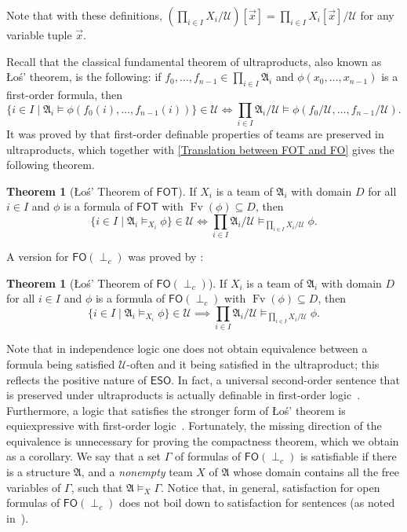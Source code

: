 \documentclass[a4paper]{amsart}
\theoremstyle{definition}
\newtheorem{theorem}[definition]{Theorem}
\theoremstyle{remark}
\newcommand{\A}{\mathcal{A}}
\newcommand{\U}{\mathcal{U}}
\newcommand{\vx}{\vec{x}}
\DeclareMathOperator{\Fv}{Fv}
\newcommand\fot{\mathsf{FOT}}
\newcommand\eso{\mathsf{ESO}}
\newcommand\foil{\mathsf{FO}(\perp_c)}
\theoremstyle{definition}
\renewcommand{\A}{\mathfrak{A}}
\begin{document}
Note that with these definitions, $\left(\prod_{i\in I}X_i/\U\right)[\vx] = \prod_{i\in I}X_i[\vx]/\U$ for any variable tuple $\vx$.

Recall that the classical fundamental theorem of ultraproducts, also known as Łoś' theorem, is the following: if $f_0,\dots,f_{n-1}\in\prod_{i\in I}\A_i$ and $\phi(x_0,\dots,x_{n-1})$ is a first-order formula, then
\[
    \{i\in I \mid \A_i\models\phi(f_0(i),\dots,f_{n-1}(i)) \}\in\U \iff \prod_{i\in I}\A_i/\U \models\phi(f_0/\U,\dots,f_{n-1}/\U).
\]
It was proved by \textcite{luck2020team} that first-order definable properties of teams are preserved in ultraproducts, which together with \cref{Translation between FOT and FO} gives the following theorem. 

\begin{theorem}[Łoś' Theorem of $\fot$]\label{Los theorem of FOT}
    If $X_i$ is a team of $\A_i$ with domain $D$ for all $i\in I$ and $\phi$ is a formula of $\fot$ with $\Fv(\phi)\subseteq D$, then
    \[
        \{ i\in I \mid \A_i\models_{X_i}\phi \}\in\U \iff \prod_{i\in I}\A_i/\U\models_{\prod_{i\in I}X_i/\U}\phi.
    \]
\end{theorem}

\noindent A version for $\foil$ was proved by \textcite{puljujärvi2022compactness}:

\begin{theorem}[Łoś' Theorem of $\foil$]\label{Los theorem of FOIL}
    If $X_i$ is a team of $\A_i$ with domain $D$ for all $i\in I$ and $\phi$ is a formula of $\foil$ with $\Fv(\phi)\subseteq D$, then
    \[
        \{ i\in I \mid \A_i\models_{X_i}\phi \}\in\U \implies \prod_{i\in I}\A_i/\U\models_{\prod_{i\in I}X_i/\U}\phi.
    \]
\end{theorem}

\noindent Note that in independence logic one does not obtain equivalence between a formula being satisfied $\U$-often and it being satisfied in the ultraproduct; this reflects the positive nature of $\eso$. In fact, a universal second-order sentence that is preserved under ultraproducts is actually definable in first-order logic~\cite{keisler-thesis}. Furthermore, a logic that satisfies the stronger form of Łoś' theorem is equiexpressive with first-order logic~\cite{sgro1977maximal}. Fortunately, the missing direction of the equivalence is unnecessary for proving the compactness theorem, which we obtain as a corollary. We say that a set $\Gamma$ of formulas of $\foil$ is satisfiable if there is a structure $\A$, and a \emph{nonempty} team $X$ of $\A$ whose domain contains all the free variables of $\Gamma$, such that $\A\models_X\Gamma$. Notice that, in general, satisfaction for open formulas of $\foil$ does not boil down to satisfaction for sentences (as noted in~\cite{puljujärvi2022compactness}).
\end{document}
